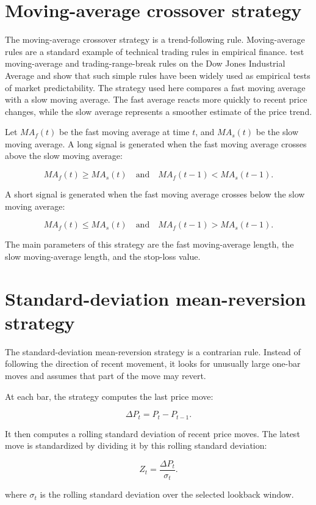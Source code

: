\section{Moving-average crossover strategy}

The moving-average crossover strategy is a trend-following rule. Moving-average rules are a standard
example of technical trading rules in empirical finance. \citet{brock1992} test moving-average and
trading-range-break rules on the Dow Jones Industrial Average and show that such simple rules have
been widely used as empirical tests of market predictability. The strategy used here compares a fast
moving average with a slow moving average. The fast average reacts more quickly to recent price
changes, while the slow average represents a smoother estimate of the price trend.

Let \(MA_f(t)\) be the fast moving average at time \(t\), and \(MA_s(t)\) be the slow moving
average. A long signal is generated when the fast moving average crosses above the slow moving
average:

\[
MA_f(t) \geq MA_s(t)
\quad \text{and} \quad
MA_f(t-1) < MA_s(t-1).
\]

A short signal is generated when the fast moving average crosses below the slow moving average:

\[
MA_f(t) \leq MA_s(t)
\quad \text{and} \quad
MA_f(t-1) > MA_s(t-1).
\]

The main parameters of this strategy are the fast moving-average length, the slow moving-average
length, and the stop-loss value.

\section{Standard-deviation mean-reversion strategy}

The standard-deviation mean-reversion strategy is a contrarian rule. Instead of following the
direction of recent movement, it looks for unusually large one-bar moves and assumes that part of
the move may revert.

At each bar, the strategy computes the last price move:

\[
\Delta P_t = P_t - P_{t-1}.
\]

It then computes a rolling standard deviation of recent price moves. The latest move is standardized
by dividing it by this rolling standard deviation:

\[
Z_t = \frac{\Delta P_t}{\sigma_t}.
\]

where \(\sigma_t\) is the rolling standard deviation over the selected lookback window.


